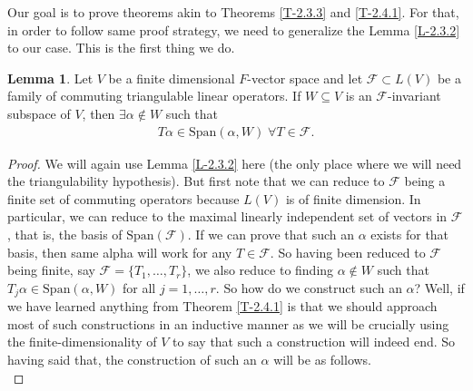 \documentclass[letterpaper,11pt,twoside]{article}
\theoremstyle{definition}
\theoremstyle{definition}
\theoremstyle{definition}
\theoremstyle{definition}
\newtheorem{lemma}[proposition]{\textbf{Lemma}}
\theoremstyle{definition}
\theoremstyle{definition}
\theoremstyle{remark}
\theoremstyle{definition}
\newcommand{\Span}[1]{\text{Span}\left(#1\right)}
\begin{document}
 Our goal is to prove theorems akin to Theorems \ref{T-2.3.3} and \ref{T-2.4.1}. For that, in order to follow same proof strategy, we need to generalize the Lemma \ref{L-2.3.2} to our case. This is the first thing we do.
 \begin{lemma}\label{L-2.5.1}
    Let $V$ be a finite dimensional $F$-vector space and let $\mathcal{F} \subset L(V)$ be a family of commuting triangulable linear operators. If $W\subseteq V$ is an $\mathcal{F}$-invariant subspace of $V$, then $\exists \alpha \notin W$ such that 
    \begin{align*}
        T\alpha \in \Span{\alpha, W} \;\forall T\in \mathcal{F}.
    \end{align*}
 \end{lemma}
 \begin{proof}
    We will again use Lemma \ref{L-2.3.2} here (the only place where we will need the triangulability hypothesis). But first note that we can reduce to $\mathcal{F}$ being a finite set of commuting operators because $L(V)$ is of finite dimension. In particular, we can reduce to the maximal linearly independent set of vectors in $\mathcal{F}$, that is, the basis of $\Span{\mathcal{F}}$. If we can prove that such an $\alpha $ exists for that basis, then same alpha will work for any $T\in \mathcal{F}$. So having been reduced to $\mathcal{F}$ being finite, say $\mathcal{F} = \{T_1,\dots,T_r\}$, we also reduce to finding $\alpha \notin W$ such that $T_j\alpha \in \Span{\alpha,W}$ for all $j=1,\dots,r$. So how do we construct such an $\alpha$? Well, if we have learned anything from Theorem \ref{T-2.4.1} is that we should approach most of such constructions in an inductive manner as we will be crucially using the finite-dimensionality of $V$ to say that such a construction will indeed end. So having said that, the construction of such an $\alpha$ will be as follows.\\
    

\end{proof}
\end{document}
